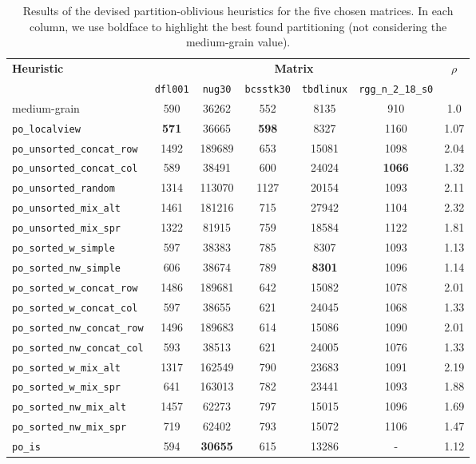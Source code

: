 \begin{table}[h]
	\centering

	\renewcommand{\arraystretch}{1.2}
	\begin{tabular}{|l||c|c|c|c|c||c|}
		\hline
		\multirow{2}{*}{\textbf{Heuristic}} &  \multicolumn{5}{c||}{\textbf{Matrix}} & \multirow{2}{*}{$\rho$} \\ \cline{2-6}
		& \texttt{dfl001} & \texttt{nug30} & \texttt{bcsstk30} & \texttt{tbdlinux} & \texttt{rgg\_n\_2\_18\_s0} & \\ \hline
		medium-grain & 590 & 36262 & 552 & 8135 & 910 & 1.0 \\ \hline %
		\verb|po_localview|& \textbf{571} & 36665 & \textbf{598} & 8327 & 1160  & 1.07 \\  %
		\verb|po_unsorted_concat_row|& 1492 & 189689 & 653 & 15081 & 1098 & 2.04 \\ %
		\verb|po_unsorted_concat_col|& 589 & 38491  & 600 & 24024 & \textbf{1066} & 1.32 \\ %
		\verb|po_unsorted_random|& 1314 & 113070 & 1127 & 20154 & 1093 & 2.11 \\  %
		\verb|po_unsorted_mix_alt|& 1461 & 181216 & 715 & 27942 & 1104 & 2.32 \\  %
		\verb|po_unsorted_mix_spr|& 1322 & 81915 & 759 & 18584 & 1122 & 1.81 \\  %
		\verb|po_sorted_w_simple|& 597 & 38383 & 785  & 8307 & 1093 & 1.13 \\ %
		\verb|po_sorted_nw_simple|& 606 & 38674 & 789 & \textbf{8301} & 1096 & 1.14 \\ %
		\verb|po_sorted_w_concat_row|& 1486 & 189681 & 642 & 15082 & 1078 & 2.01 \\ %
		\verb|po_sorted_w_concat_col|& 597 & 38655 & 621 & 24045 & 1068 & 1.33 \\  %
		\verb|po_sorted_nw_concat_row|& 1496 & 189683 & 614 & 15086 & 1090 & 2.01 \\ %
		\verb|po_sorted_nw_concat_col|& 593 & 38513 & 621 & 24005 & 1076 & 1.33 \\ %
		\verb|po_sorted_w_mix_alt|& 1317 & 162549 & 790 & 23683 & 1091 & 2.19 \\ %
		\verb|po_sorted_w_mix_spr|& 641 & 163013 & 782 & 23441 & 1093 & 1.88 \\ %
		\verb|po_sorted_nw_mix_alt|& 1457 & 62273 & 797 & 15015 & 1096 & 1.69 \\ %
		\verb|po_sorted_nw_mix_spr|& 719 & 62402 & 793 & 15072 & 1106 & 1.47 \\  %
		\verb|po_is|& 594 & \textbf{30655} & 615 & 13286 & -  & 1.12 \\ %
		\hline
	\end{tabular}
	\caption{Results of the devised partition-oblivious heuristics for the five chosen matrices. In each column, we use boldface to highlight the best found partitioning (not considering the medium-grain value).} \label{tab:preliminary_po}
\end{table}

